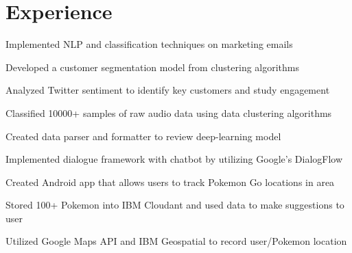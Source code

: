 \documentclass[]{deedy-resume-openfont}
\begin{document}
\hfill
\begin{minipage}[t]{0.66\textwidth} 


\section{Experience}

\sectionsep
\begin{tightemize} 
\item Implemented NLP and classification techniques on marketing emails
\item Developed a customer segmentation model from clustering algorithms
\item Analyzed Twitter sentiment to identify key customers and study engagement
\end{tightemize}
\sectionsep

\begin{tightemize} 
\item Classified 10000+ samples of raw audio data using data clustering algorithms
\item Created data parser and formatter to review deep-learning model
\item Implemented dialogue framework with chatbot by utilizing Google's DialogFlow
\end{tightemize}
\sectionsep


\begin{tightemize} 
\item Created Android app that allows users to track Pokemon Go locations in area 
\item Stored 100+ Pokemon into IBM Cloudant and used data to make suggestions to user
\item  Utilized Google Maps API and IBM Geospatial to record user/Pokemon location
\end{tightemize}
\sectionsep


\end{minipage}
\end{document}
